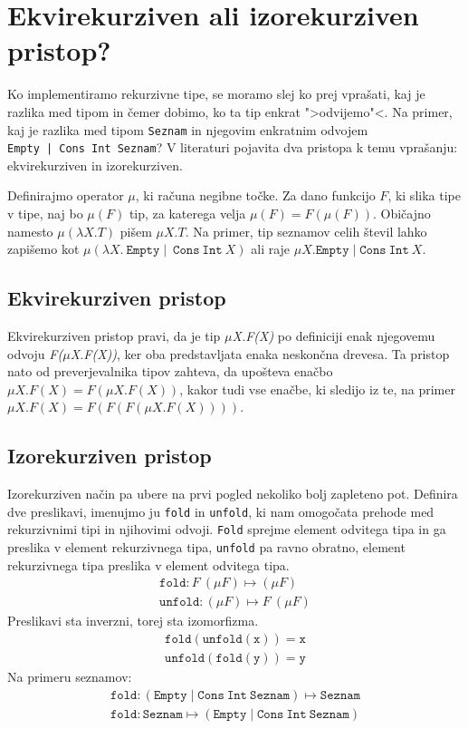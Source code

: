 \documentclass[a4paper,12pt,openright]{book}
\begin{document}
\section{Ekvirekurziven ali izorekurziven pristop?}
Ko implementiramo rekurzivne tipe, se moramo slej ko prej vprašati, kaj je razlika med tipom in čemer dobimo, ko ta tip enkrat ">odvijemo"<. Na primer, kaj je razlika med tipom \lstinline{Seznam}
in njegovim enkratnim odvojem \\ \lstinline{Empty | Cons Int Seznam}? V literaturi pojavita dva pristopa k temu vprašanju: ekvirekurziven in izorekurziven.

Definirajmo operator $\mu$, ki računa negibne točke. Za dano funkcijo $F$, ki slika tipe v tipe, naj bo $\mu(F)$ tip, za katerega velja $\mu(F) = F(\mu(F))$. Običajno namesto $\mu (\lambda X. T)$ 
pišem $\mu X. T$. Na primer, tip seznamov celih števil lahko zapišemo kot $\mu (\lambda X. \ \mathtt{Empty} \mid \ \mathtt{Cons} \ \mathtt{Int} \ X)$ ali raje $\mu X. \mathtt{Empty} \mid \mathtt{Cons} \ \mathtt{Int} \ X$.

\subsection{Ekvirekurziven pristop}
Ekvirekurziven pristop pravi, da je tip \emph{\(\mu\)X.F(X)} po definiciji enak njegovemu odvoju \emph{F(\(\mu\)X.F(X))}, ker oba predstavljata enaka neskončna drevesa. Ta pristop nato od 
preverjevalnika tipov zahteva, da upošteva enačbo $\mu X . F(X) = F(\mu X . F(X))$, kakor tudi vse enačbe, ki sledijo iz te, na primer $\mu X. F(X) = F(F(F(\mu X . F(X))))$. 

\subsection{Izorekurziven pristop}
Izorekurziven način pa ubere na prvi pogled nekoliko bolj zapleteno pot. Definira dve preslikavi, imenujmo ju \lstinline{fold} in \lstinline{unfold}, ki nam omogočata prehode med rekurzivnimi tipi in njihovimi odvoji. 
\lstinline{Fold} sprejme element odvitega tipa in ga preslika v element rekurzivnega tipa, \lstinline{unfold} pa ravno obratno, element rekurzivnega tipa preslika v element odvitega tipa.
\begin{align*}
    \mathtt{fold} : F \ (\mu F) \mapsto (\mu F)\\
    \mathtt{unfold} : (\mu F) \mapsto F \ (\mu F)
\end{align*}
Preslikavi sta inverzni, torej sta izomorfizma.
\begin{align*}
  \mathtt{fold(unfold(x)) = x}\\
  \mathtt{unfold(fold(y)) = y}
\end{align*}
Na primeru seznamov:
\begin{align*}
  \mathtt{fold} : (\mathtt{Empty} \mid \mathtt{Cons} \ \mathtt{Int} \ \mathtt{Seznam}) \mapsto \mathtt{Seznam}\\
  \mathtt{fold} : \mathtt{Seznam} \mapsto (\mathtt{Empty} \mid \mathtt{Cons} \ \mathtt{Int} \ \mathtt{Seznam})
\end{align*}
\end{document}
